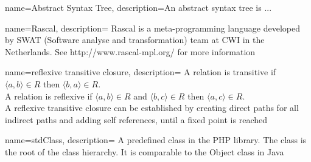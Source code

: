 \documentclass[main.tex]{subfiles}
\begin{document}
    {
        name=Abstract Syntax Tree,
        description={An abstract syntax tree is ...}
    }
    
    {
        name=Rascal,
        description={
            Rascal is a meta-programming language developed by SWAT (Software analyse and transformation) team at CWI in the Netherlands}.
            See http://www.rascal-mpl.org/ for more information
    }
    
    {
        name=reflexive transitive closure,
        description={
            A relation is transitive if $\langle a,b \rangle \in R$ then $\langle b,a \rangle \in R$. \\
            A relation is reflexive if $\langle a,b \rangle \in R$ and $\langle b,c \rangle \in R$ then $\langle a,c \rangle \in R$. \\
            A reflexive transitive closure can be established by creating direct paths for all indirect paths and adding self references, until a fixed point is reached}
    }
    
    {
        name=stdClass,
        description={
            A predefined class in the PHP library. The class is the root of the class hierarchy. 
            It is comparable to the Object class in Java}
    }
\end{document}
